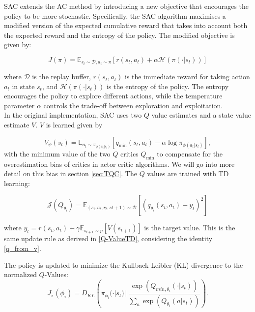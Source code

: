 SAC extends the AC method by introducing a new objective that encourages the policy to be more stochastic. Specifically, the SAC algorithm maximises a modified 
version of the expected cumulative reward that takes into account both the expected reward and the entropy of the policy. The modified objective is given by:

\begin{equation}
J(\pi) = \mathbb{E}_{s_t \sim \mathcal{D}, a_t \sim \pi}[r(s_t, a_t) + \alpha \mathcal{H}(\pi(\cdot|s_t))]
\end{equation}

where $\mathcal{D}$ is the replay buffer, $r(s_t, a_t)$ is the immediate reward for taking action $a_t$ in state $s_t$, and $\mathcal{H}(\pi(\cdot|s_t))$ is the entropy of the policy. The entropy 
encourages the policy to explore different actions, while the temperature parameter $\alpha$ controls the trade-off between exploration and exploitation.\\

In the original implementation, SAC uses two $Q$ value estimates and a state value estimate $V$. $V$ is learned given by 

\begin{equation}
    V_{\psi}(s_t) = \mathbb{E}_{a_t \sim \pi_{\phi(a_t|s_t)}}[q_\text{min}(s_t, a_t) - \alpha \log \pi_{\phi(a_t|s_t)}],
\end{equation}
with the minimum value of the two $Q$ critics $Q_\text{min}$ to compensate for the overestimation bias of critics in actor critic 
algorithms. We will 
go into more detail on this bias in section \ref{sec:TQC}.
The $Q$ values are trained with TD learning:

\begin{equation}
    \mathcal{J}(Q_{\theta_i}) = \mathbb{E}_{(s_t, a_t, r_t, s{t+1}) \sim \mathcal{D}}[(q_{\theta_i}(s_t,a_t) - y_t)^2]
\end{equation}

where $y_t = r(s_t, a_t) + \gamma \mathbb{E}_{s_{t+1} \sim p}[V(s_{t+1})]$ is the target value. This is the same update rule as derived in \ref{Q-ValueTD}, 
considering the identity \ref{q_from_v}.

The policy is updated to minimize the Kullback-Leibler (KL) divergence to the normalized $Q$-Values:
\begin{equation}
    \label{sac_pol_obj}
    J_\pi(\phi_{i}) = D_{KL} \left( \pi_{\phi_{i}}(\cdot|s_t) || \frac{\exp(Q_{min, {\theta_i}}(\cdot|s_t))}{\underset{a}{\sum}  \exp(Q_{\theta_i}(a|s_t))} \right).
\end{equation}

